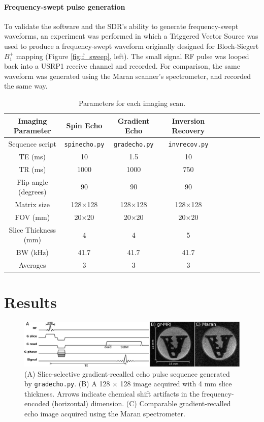 \documentclass[10pt,letterpaper]{article}
\begin{document}
\paragraph{Frequency-swept pulse generation}
To validate the software and the SDR's ability to generate frequency-swept waveforms, 
an experiment was performed in which a Triggered Vector Source was used to 
produce a frequency-swept waveform originally designed for Bloch-Siegert $B_1^+$ mapping \cite{janki:2013} (Figure \ref{fig:f_sweep}, left).
The small signal RF pulse was looped back into a USRP1 receive channel and recorded.
For comparison, the same waveform was generated using the Maran scanner's spectrometer,
and recorded the same way.

\begin{table}
\begin{tabular}[c]{| c | c | c | c | c | c | c | c | c | c |}
	\hline
	\textbf{Imaging Parameter} & \textbf{Spin Echo} & \textbf{Gradient Echo} & \textbf{Inversion Recovery} \\ \hline
	Sequence script & \texttt{spinecho.py} & \texttt{gradecho.py} & \texttt{invrecov.py} \\ \hline
	TE (ms) & 10 & 1.5 & 10\\ \hline
	TR (ms) & 1000 & 1000 & 750\\ \hline
	Flip angle (degrees) & 90 & 90 & 90\\ \hline
	Matrix size & 128$\times$128 & 128$\times$128 & 128$\times$128\\ \hline
	FOV (mm) & 20$\times$20 & 20$\times$20 & 20$\times$20\\ \hline
	Slice Thickness (mm) & 4 & 4 & 5\\ \hline
	BW (kHz) & 41.7 & 41.7 & 41.7\\ \hline
	Averages & 3 & 3 & 3\\ \hline
\end{tabular}
\caption{Parameters for each imaging scan.}
\label{table:parameters}
\end{table}  


\section*{Results}

\begin{figure}[h]
\begin{center}
\includegraphics[width = 1\textwidth,trim=0 0 0 0,clip=false]{GRE_results.png}
\caption{{(A) Slice-selective gradient-recalled echo pulse sequence generated by \texttt{gradecho.py}.
(B) A 128 $\times$ 128 image acquired with 4 mm slice thickness.  
Arrows indicate chemical shift artifacts in the frequency-encoded (horizontal) dimension.
(C) Comparable gradient-recalled echo image acquired using the Maran spectrometer.}}
\label{fig:gre_image}
\end{center}
\end{figure}
 
\end{document}

